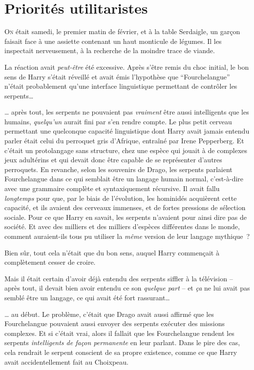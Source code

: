 \chapter{Priorités utilitaristes}

\lettrine{O}{n} était samedi, le premier matin de février, et à la table Serdaigle, un garçon faisait face à une assiette contenant un haut monticule de légumes. Il les inspectait nerveusement, à la recherche de la moindre trace de viande.

La réaction avait \emph{peut-être} été excessive. Après s'être remis du choc initial, le bon sens de Harry s'était réveillé et avait émis l'hypothèse que “Fourchelangue” n'était probablement qu'une interface linguistique permettant de contrôler les serpents…

… après tout, les serpents ne pouvaient pas \emph{vraiment} être aussi intelligents que les humains, \emph{quelqu'un} aurait fini par s'en rendre compte. Le plus petit cerveau permettant une quelconque capacité linguistique dont Harry avait jamais entendu parler était celui du perroquet gris d'Afrique, entraîné par Irene Pepperberg. Et c'était un protolangage sans structure, chez une espèce qui jouait à de complexes jeux adultérins et qui devait donc être capable de se représenter d'autres perroquets. En revanche, selon les souvenirs de Drago, les serpents parlaient Fourchelangue dans ce qui semblait être un langage humain normal, c'est-à-dire avec une grammaire complète et syntaxiquement récursive. Il avait fallu \emph{longtemps} pour que, par le biais de l'évolution, les hominidés acquièrent cette capacité, et ils avaient des cerveaux immenses, et de fortes pressions de sélection sociale. Pour ce que Harry en savait, les serpents n'avaient pour ainsi dire pas de société. Et avec des milliers et des milliers d'espèces différentes dans le monde, comment auraient-ils tous pu utiliser la \emph{même} version de leur langage mythique~?

Bien sûr, tout cela n'était que du bon sens, auquel Harry commençait à complètement cesser de croire.

Mais il était certain d'avoir déjà entendu des serpents siffler à la télévision -- après tout, il devait bien avoir entendu ce son \emph{quelque part} -- et \emph{ça} ne lui avait pas semblé être un langage, ce qui avait été fort rassurant…

… au début. Le problème, c'était que Drago avait aussi affirmé que les Fourchelangue pouvaient aussi envoyer des serpents exécuter des missions complexes. Et si c'était vrai, alors il fallait que les Fourchelangue rendent les serpents \emph{intelligents de façon permanente} en leur parlant. Dans le pire des cas, cela rendrait le serpent conscient de sa propre existence, comme ce que Harry avait accidentellement fait au Choixpeau.

